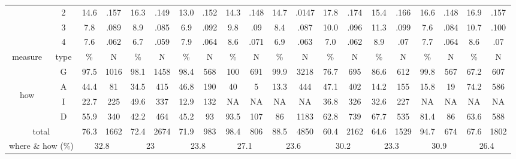 \begin{table}
\begin{center}
\begin{footnotesize}
\begin{tabular}{|cc|cc|cc|cc|cc|cc|cc|cc|cc|cc|}
 & 2 & 14.6 & .157 & 16.3 & .149 & 13.0 & .152 & 14.3 & .148 & 14.7 & .0147 & 17.8 & .174 & 15.4 & .166 & 16.6 & .148 & 16.9 & .157 \\
 & 3 & 7.8 & .089 & 8.9 & .085 & 6.9 & .092 & 9.8 & .09 & 8.4 & .087 & 10.0 & .096 & 11.3 & .099 & 7.6 & .084 & 10.7 & .100 \\
 & 4 & 7.6 & .062 & 6.7 & .059 & 7.9 & .064 & 8.6 & .071 & 6.9 & .063 & 7.0 & .062 & 8.9 & .07 & 7.7 & .064 & 8.6 & .07 \\
\hline
measure & type & \% & N & \% & N & \% & N & \% & N & \% & N & \% & N & \% & N & \% & N & \% & N \\
\hline
 & G & 97.5 & 1016 & 98.1 & 1458 & 98.4 & 568 & 100 & 691 & 99.9 & 3218 & 76.7 & 695 & 86.6 & 612 & 99.8 & 567 & 67.2 & 607 \\
\multirow{3}{3mm}{\begin{sideways}\parbox{3mm}{\begin{small}how\end{small}}\end{sideways}}
 & A & 44.4 & 81 & 34.5 & 415 & 46.8 & 190 & 40 & 5 & 13.3 & 444 & 47.1 & 402 & 14.2 & 155 & 15.8 & 19 & 74.2 & 586 \\
 & I & 22.7 & 225 & 49.6 & 337 & 12.9 & 132 & NA & NA & NA & NA & 36.8 & 326 & 32.6 & 227 & NA & NA & NA & NA \\
 & D & 55.9 & 340 & 42.2 & 464 & 45.2 & 93 & 93.5 & 107 & 86 & 1183 & 62.8 & 739 & 67.7 & 535 & 81.4 & 86 & 63.6 & 588 \\
\multicolumn{2}{|c|}{total} & 76.3 & 1662 & 72.4 & 2674 & 71.9 & 983 & 98.4 & 806 & 88.5 & 4850 & 60.4 & 2162 & 64.6 & 1529 & 94.7 & 674 & 67.6 & 1802 \\
\hline
\multicolumn{2}{|c|}{where \& how (\%)} & \multicolumn{2}{|c|}{32.8} & \multicolumn{2}{|c|}{23}& \multicolumn{2}{|c|}{23.8}& \multicolumn{2}{|c|}{27.1}& \multicolumn{2}{|c|}{23.6}& \multicolumn{2}{|c|}{30.2}& \multicolumn{2}{|c|}{23.3}& \multicolumn{2}{|c|}{30.9}& \multicolumn{2}{|c|}{26.4}\\
\hline
\end{tabular}
\label{tab:all_results}
\end{footnotesize}
\end{center}
\end{table}

